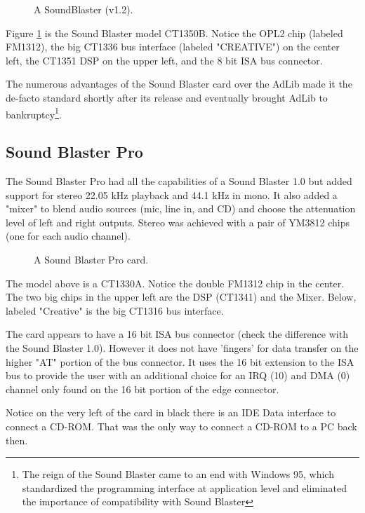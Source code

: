 \documentclass[book.tex]{subfiles}
\begin{document}
\begin{figure}[H] 
  \centering 
  \caption{A SoundBlaster (v1.2). }
  \label{asb12}
\end{figure}
\par
Figure \ref{asb12} is the Sound Blaster model CT1350B. Notice the OPL2 chip (labeled FM1312), the big CT1336 bus interface (labeled "CREATIVE") on the center left, the CT1351 DSP on the upper left, and the 8 bit ISA bus connector.\\
\par
   The numerous advantages of the Sound Blaster card over the AdLib made it the de-facto standard shortly after its release and eventually brought AdLib to bankruptcy\footnote{The reign of the Sound Blaster came to an end with Windows 95, which standardized the programming interface at application level and eliminated the importance of compatibility with Sound Blaster}.





  \subsection{Sound Blaster Pro}
The Sound Blaster Pro had all the capabilities of a Sound Blaster 1.0 but added support for stereo 22.05 kHz playback and 44.1 kHz in mono. It also added a "mixer" to blend audio sources (mic, line in, and CD) and choose the attenuation level of left and right outputs. Stereo was achieved with a pair of YM3812 chips (one for each audio channel).\\\label{sbmixerpage}
\begin{figure}[H] 
  \centering 
  \caption{A Sound Blaster Pro card.}
\end{figure}
The model above is a CT1330A. Notice the double FM1312 chip in the center. The two big chips in the upper left are the DSP (CT1341) and the Mixer. Below, labeled "Creative" is the big CT1316 bus interface.\\
\par
{} The card appears to have a 16 bit ISA bus connector (check the difference with the Sound Blaster 1.0). However it does not have 'fingers' for data transfer on the higher "AT" portion of the bus connector. It uses the 16 bit extension to the ISA bus to provide the user with an additional choice for an IRQ (10) and DMA (0) channel only found on the 16 bit portion of the edge connector.\\
\par
{} Notice on the very left of the card in black there is an IDE Data interface to connect a CD-ROM. That was the only way to connect a CD-ROM to a PC back then.
\end{document}

